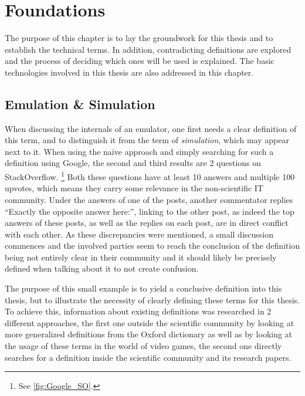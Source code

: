 \chapter{Foundations}\label{chap:Foundations}
The purpose of this chapter is to lay the groundwork for this thesis
and to establish the technical terms.
In addition, contradicting definitions are explored
and the process of deciding which ones will be used is explained.
The basic technologies involved in this thesis are also addressed in this chapter.

\section{Emulation \& Simulation}
When discussing the internals of an emulator, one first needs a clear definition of this term,
and to distinguish it from the term of \emph{simulation}, which may appear next to it.
When using the naive approach and simply searching for such a definition using Google,
the second and third results are 2 questions on StackOverflow\cite{SO_link}\cite{SO}.
\footnote{See \autoref{fig:Google_SO}.}
Both these questions have at least 10 answers and multiple 100 upvotes,
which means they carry some relevance in the non-scientific IT community.
Under the answers of one of the posts, another commentator replies
\enquote{Exactly the opposite answer here:}\cite{SO_link},
linking to the other post\cite{SO},
as indeed the top answers of these posts, as well as the replies on each post,
are in direct conflict with each other.
As these discrepancies were mentioned,
a small discussion commences and the involved parties seem to reach the conclusion
of the definition being not entirely clear in their community and it should likely be precisely defined when talking about it
to not create confusion.

The purpose of this small example is to yield a conclusive definition into this thesis,
but to illustrate the necessity of clearly defining these terms for this thesis.
To achieve this, information about existing definitions was researched in 2 different approaches,
the first one outside the scientific community by looking at more generalized definitions from the Oxford dictionary
as well as by looking at the usage of these terms in the world of video games,
the second one directly searches for a definition inside the scientific community and its research papers.

